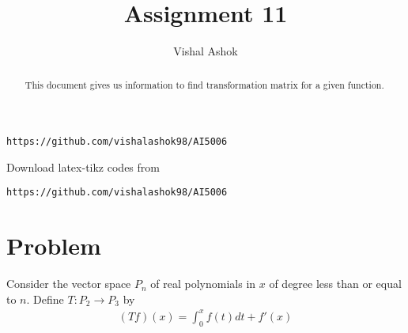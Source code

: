 \documentclass[journal,12pt,twocolumn]{IEEEtran}
\begin{document}
\makeatletter
{}
\makeatother
\let\StandardTheFigure\thefigure
\let\vec\mathbf
\renewcommand{\thefigure}{\theproblem}
\def\putbox#1#2#3{\makebox[0in][l]{\makebox[#1][l]{}\raisebox{\baselineskip}[0in][0in]{\raisebox{#2}[0in][0in]{#3}}}}
     \def\rightbox#1{\makebox[0in][r]{#1}}
     \def\centbox#1{\makebox[0in]{#1}}
     \def\topbox#1{\raisebox{-\baselineskip}[0in][0in]{#1}}
     \def\midbox#1{\raisebox{-0.5\baselineskip}[0in][0in]{#1}}
\vspace{3cm}
\title{Assignment 11}
\author{Vishal Ashok}
\maketitle
\newpage
\bigskip
\renewcommand{\thefigure}{\theenumi}
\renewcommand{\thetable}{\theenumi}
\begin{abstract}
This document gives us information to find transformation matrix for a given function.
\end{abstract}

%
\begin{lstlisting}
https://github.com/vishalashok98/AI5006\end{lstlisting}
%
Download latex-tikz codes from 
%
\begin{lstlisting}
https://github.com/vishalashok98/AI5006\end{lstlisting}
%
\section{Problem}
Consider the vector space $P_n$ of real polynomials in $x$ of degree less than or equal to $n$. Define $T:P_2 \rightarrow P_3$ by 
\begin{align}
(Tf)(x)=\int_{0}^{x}f(t)dt+f'(x)    
\end{align}
\end{document}
